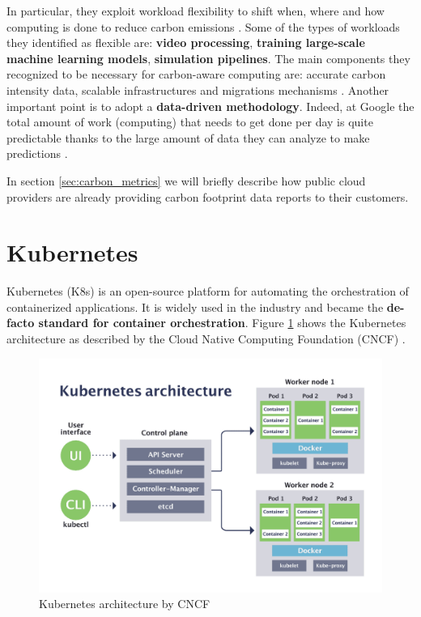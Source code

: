 In particular, they exploit workload flexibility to shift when, where and how computing is done to reduce carbon emissions \cite{google_carbon_aware_computing}.
Some of the types of workloads they identified as flexible are: \textbf{video processing}, \textbf{training large-scale machine learning models}, \textbf{simulation pipelines}.
The main components they recognized to be necessary for carbon-aware computing are: accurate carbon intensity data, scalable infrastructures and migrations mechanisms \cite{google_carbon_aware_computing}.
Another important point is to adopt a \textbf{data-driven methodology}.
Indeed, at Google the total amount of work (computing) that needs to get done per day is quite predictable thanks to the large amount of data they can analyze to make predictions \cite{google_carbon_aware_computing}.

In section \ref{sec:carbon_metrics} we will briefly describe how public cloud providers are already providing carbon footprint data reports to their customers.

\section{Kubernetes}

Kubernetes (K8s) is an open-source platform for automating the orchestration of containerized applications.
It is widely used in the industry and became the \textbf{de-facto standard for container orchestration}.
Figure \ref{fig:kubernetes_architecture} shows the Kubernetes architecture as described by the Cloud Native Computing Foundation (CNCF) \cite{kubernetes_cnfc}.

\begin{figure}[t]
    \centering
    \includegraphics[width=1\linewidth]{images/kubernetes-architecture-diagram.png}
    \caption{Kubernetes architecture by CNCF \cite{kubernetes_cnfc}}
    \label{fig:kubernetes_architecture}
\end{figure}

